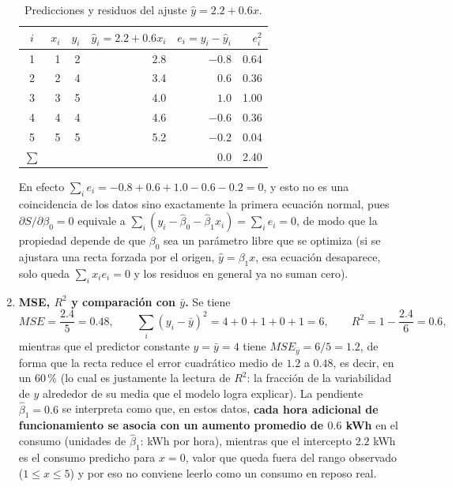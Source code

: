 \begin{enumerate}
\begin{table}[H]
\centering
\begin{tabular}{crrrrr}
\toprule
$i$ & $x_i$ & $y_i$ & $\hat y_i = 2.2+0.6x_i$ & $e_i=y_i-\hat y_i$ & $e_i^2$ \\
\midrule
1 & 1 & 2 & 2.8 & $-0.8$ & 0.64 \\
2 & 2 & 4 & 3.4 & $0.6$  & 0.36 \\
3 & 3 & 5 & 4.0 & $1.0$  & 1.00 \\
4 & 4 & 4 & 4.6 & $-0.6$ & 0.36 \\
5 & 5 & 5 & 5.2 & $-0.2$ & 0.04 \\
\midrule
$\sum$ & & & & $0.0$ & 2.40 \\
\bottomrule
\end{tabular}
\caption{Predicciones y residuos del ajuste $\hat y = 2.2 + 0.6x$.}
\label{tab:ej1-residuos}
\end{table}

En efecto $\sum_ie_i=-0.8+0.6+1.0-0.6-0.2=0$, y esto no es una
coincidencia de los datos sino exactamente la primera ecuación normal,
pues $\partial S/\partial\beta_0=0$ equivale a
$\sum_i(y_i-\hat\beta_0-\hat\beta_1x_i)=\sum_ie_i=0$, de modo que la
propiedad depende de que $\beta_0$ sea un parámetro libre que se
optimiza (si se ajustara una recta forzada por el origen,
$\hat y=\beta_1x$, esa ecuación desaparece, solo queda
$\sum_ix_ie_i=0$ y los residuos en general ya no suman cero).

\item \textbf{MSE, $R^2$ y comparación con $\bar y$.}
Se tiene
\[
    MSE = \frac{2.4}{5} = 0.48, \qquad
    \sum_i (y_i-\bar y)^2 = 4+0+1+0+1 = 6, \qquad
    R^2 = 1 - \frac{2.4}{6} = 0.6 ,
\]
mientras que el predictor constante $\hat y=\bar y=4$ tiene
$MSE_{\bar y}=6/5=1.2$, de forma que la recta reduce el error cuadrático
medio de $1.2$ a $0.48$, es decir, en un 60\,\% (lo cual es justamente
la lectura de $R^2$: la fracción de la variabilidad de $y$ alrededor de
su media que el modelo logra explicar). La pendiente
$\hat\beta_1=0.6$ se interpreta como que, en estos datos, \textbf{cada
hora adicional de funcionamiento se asocia con un aumento promedio de
$0.6$ kWh} en el consumo (unidades de $\hat\beta_1$: kWh por hora), mientras que el intercepto $2.2$ kWh es el
consumo predicho para $x=0$, valor que queda fuera del rango observado
($1\le x\le5$) y por eso no conviene leerlo como un consumo en reposo
real.


\end{enumerate}
